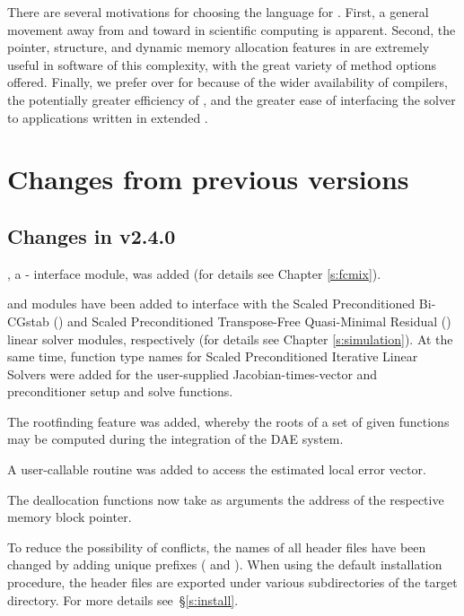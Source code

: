 There are several motivations for choosing the {\C} language for {\ida}.
First, a general movement away from {\F} and toward {\C} in scientific
computing is apparent.  Second, the pointer, structure, and dynamic
memory allocation features in {\C} are extremely useful in software of
this complexity, with the great variety of method options offered.
Finally, we prefer {\C} over {\CPP} for {\ida} because of the wider
availability of {\C} compilers, the potentially greater efficiency of {\C},
and the greater ease of interfacing the solver to applications written
in extended {\F}.

\section{Changes from previous versions}

\subsection*{Changes in v2.4.0}

{\fida}, a {\F}-{\C} interface module, was added (for details see Chapter
\ref{s:fcmix}).

{\idaspbcg} and {\idasptfqmr} modules have been added to interface with the
Scaled Preconditioned Bi-CGstab ({\spbcg}) and Scaled Preconditioned
Transpose-Free Quasi-Minimal Residual ({\sptfqmr}) linear solver modules,
respectively (for details see Chapter \ref{s:simulation}).
At the same time, function type names for Scaled Preconditioned Iterative
Linear Solvers were added for the user-supplied Jacobian-times-vector and
preconditioner setup and solve functions.

The rootfinding feature was added, whereby the roots of a set of given
functions may be computed during the integration of the DAE system.

A user-callable routine was added to access the estimated local error
vector.

The deallocation functions now take as arguments the address of the respective 
memory block pointer.

To reduce the possibility of conflicts, the names of all header files have
been changed by adding unique prefixes ( and ).
When using the default installation procedure, the header files are exported
under various subdirectories of the target  directory. For more
details see~\S\ref{s:install}.

